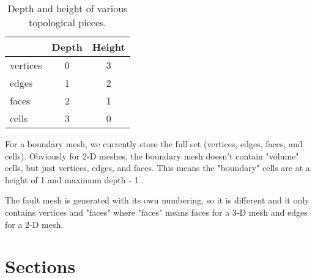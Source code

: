 \documentclass[12pt]{article}
\begin{document}
\begin{table}
\begin{center}
\begin{tabular}{|l|c|c|}
\hline
               & Depth & Height \\
\hline
    vertices   &   0   &   3 \\
    edges      &   1   &   2 \\
    faces      &   2   &   1 \\
    cells      &   3   &   0 \\
\hline
\end{tabular}
\end{center}
\caption{Depth and height of various topological pieces.}
\end{table}

  For a boundary mesh, we currently store the full set (vertices,
  edges, faces, and cells). Obviously for 2-D meshes, the boundary
  mesh doesn't contain "volume" cells, but just vertices, edges, and
  faces. This means the "boundary" cells are at a height of 1 and
  maximum depth - 1 .

  The fault mesh is generated with its own numbering, so it is
  different and it only contains vertices and "faces" where "faces"
  means faces for a 3-D mesh and edges for a 2-D mesh.

\section{Sections}
\end{document}
